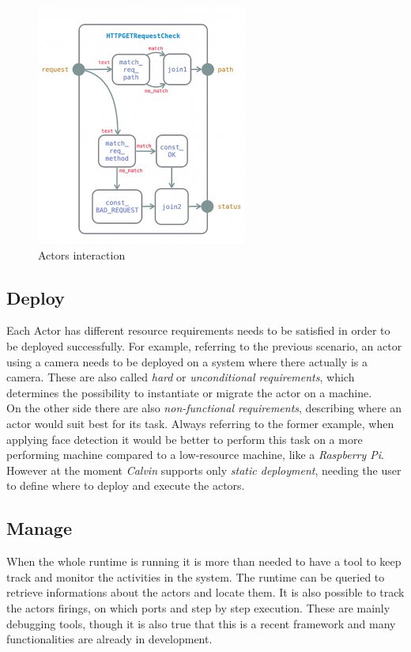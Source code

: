   \begin{figure}[h]
  \caption{Actors interaction}
  \label{fig:calvinactors}
  \centering
  \includegraphics[scale=0.75]{calvin3.png}
  \end{figure}



\subsection{Deploy}

  Each Actor has different resource requirements needs to be satisfied in order to be
  deployed successfully. For example, referring to the previous scenario, an actor
  using a camera needs to be deployed on a system where there actually is a camera. These
  are also called \textit{hard} or \textit{unconditional requirements}, which determines
  the possibility to instantiate or migrate the actor on a machine. \\
  On the other side there are also \textit{non-functional requirements}, describing where
  an actor would suit best for its task. Always referring to the former example, when applying
  face detection it would be better to perform this task on a more performing machine compared to
  a low-resource machine, like a \textit{Raspberry Pi}.\\
  However at the moment \textit{Calvin} supports only \textit{static deployment}, needing the user
  to define where to deploy and execute the actors.

\subsection{Manage}
  When the whole runtime is running it is more than needed to have a tool to keep
  track and monitor the activities in the system. The runtime can be queried to retrieve
  informations about the actors and locate them. It is also possible to track
  the actors firings, on which ports and step by step execution. These are mainly
  debugging tools, though it is also true that this is a recent framework and many
  functionalities are already in development.

